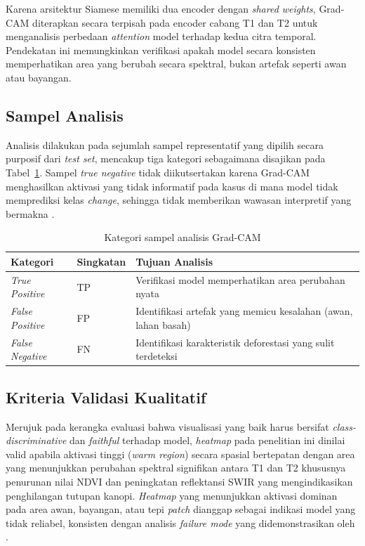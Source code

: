 Karena arsitektur Siamese memiliki dua encoder dengan \textit{shared weights}, Grad-CAM diterapkan secara terpisah pada encoder cabang T1 dan T2 untuk menganalisis perbedaan \textit{attention} model terhadap kedua citra temporal. Pendekatan ini memungkinkan verifikasi apakah model secara konsisten memperhatikan area yang berubah secara spektral, bukan artefak seperti awan atau bayangan.

\subsection{Sampel Analisis}

Analisis dilakukan pada sejumlah sampel representatif yang dipilih secara purposif dari \textit{test set}, mencakup tiga kategori sebagaimana disajikan pada Tabel~\ref{tab:gradcam_kategori}. Sampel \textit{true negative} tidak diikutsertakan karena Grad-CAM menghasilkan aktivasi yang tidak informatif pada kasus di mana model tidak memprediksi kelas \textit{change}, sehingga tidak memberikan wawasan interpretif yang bermakna \citep{DBLP:journals/corr/SelvarajuDVCPB16}.

\begin{table}[h]
	\centering
	\caption{Kategori sampel analisis Grad-CAM}
	\label{tab:gradcam_kategori}
	\begin{tabular}{llp{7.5cm}}
		\hline
		\textbf{Kategori} & \textbf{Singkatan} & \textbf{Tujuan Analisis} \\
		\hline
		\textit{True Positive}  & TP & Verifikasi model memperhatikan area perubahan nyata \\
		\textit{False Positive} & FP & Identifikasi artefak yang memicu kesalahan (awan, lahan basah) \\
		\textit{False Negative} & FN & Identifikasi karakteristik deforestasi yang sulit terdeteksi \\
		\hline
	\end{tabular}
\end{table}

\subsection{Kriteria Validasi Kualitatif}

Merujuk pada kerangka evaluasi \cite{DBLP:journals/corr/SelvarajuDVCPB16} bahwa visualisasi yang baik harus bersifat \textit{class-discriminative} dan \textit{faithful} terhadap model, \textit{heatmap} pada penelitian ini dinilai valid apabila aktivasi tinggi (\textit{warm region}) secara spasial bertepatan dengan area yang menunjukkan perubahan spektral signifikan antara T1 dan T2 khususnya penurunan nilai NDVI dan peningkatan reflektansi SWIR yang mengindikasikan penghilangan tutupan kanopi. \textit{Heatmap} yang menunjukkan aktivasi dominan pada area awan, bayangan, atau tepi \textit{patch} dianggap sebagai indikasi model yang tidak reliabel, konsisten dengan analisis \textit{failure mode} yang didemonstrasikan oleh \cite{DBLP:journals/corr/SelvarajuDVCPB16}.

